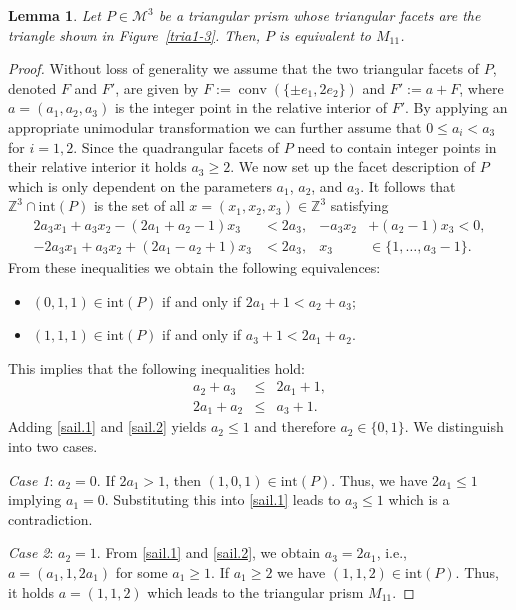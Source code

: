 \documentclass[a4paper]{article}
\theoremstyle{plain}
\newtheorem{lemma}[nn]{Lemma}
\begin{document}
\begin{lemma}
Let $P \in {\mathcal{M}^3}$ be a triangular prism whose triangular facets
are the triangle shown in Figure~\ref{tria1-3}.
Then, $P$ is equivalent to $M_{11}$.
\end{lemma}

\begin{proof}
Without loss of generality we assume that the two triangular
facets of $P$, denoted $F$ and $F'$, are given by
$F := {{\mathop{\mathrm{{conv}}}}}(\{ \pm e_1, 2 e_2\})$ and $F' := a + F$, where
$a = (a_1, a_2, a_3)$ is the integer point in the relative
interior of $F'$.
By applying an appropriate unimodular transformation we can
further assume that $0 \leq a_i < a_3$ for $i = 1,2$.
Since the quadrangular facets of $P$ need to contain integer
points in their relative interior it holds $a_3 \geq 2$.
We now set up the facet description of $P$ which is only
dependent on the parameters $a_1$, $a_2$, and $a_3$.
It follows that ${\mathbb{Z}}^3 \cap {\mathrm{int}}(P)$ is the set of all
$x = (x_1, x_2, x_3) \in {\mathbb{Z}}^3$ satisfying
\begin{align*}
  2 a_3 x_1 + a_3 x_2 - (2a_1 + a_2 - 1) x_3 & < 2 a_3, &
  - a_3 x_2 & + (a_2 - 1) x_3 < 0, \\
  -2 a_3 x_1 + a_3 x_2 + (2a_1 - a_2 + 1) x_3 & < 2 a_3, &
  x_3 & \in \{1,\ldots, a_3 - 1\}.
\end{align*}
From these inequalities we obtain the following
equivalences:
\begin{itemize} 
  \item $(0,1,1) \in {\mathrm{int}}(P)$ if and only if $2a_1 + 1 < a_2 + a_3$;  
  \item $(1,1,1) \in {\mathrm{int}}(P)$ if and only if $a_3 + 1 < 2 a_1 + a_2$. 
\end{itemize}
This implies that the following inequalities hold:
\begin{eqnarray}
  a_2 + a_3   & \le & 2 a_1 + 1, \label{sail.1} \\
  2 a_1 + a_2 & \le & a_3 + 1. \label{sail.2}
\end{eqnarray}
Adding \eqref{sail.1} and \eqref{sail.2} yields $a_2 \leq 1$
and therefore $a_2 \in \{0,1\}$. We distinguish into two
cases.

\emph{Case 1}: $a_2 = 0$.
If $2 a_1 > 1$, then $(1,0,1) \in {\mathrm{int}}(P)$. 
Thus, we have $2 a_1 \leq 1$ implying $a_1 = 0$.
Substituting this into \eqref{sail.1} leads to $a_3 \leq 1$
which is a contradiction.

\emph{Case 2}: $a_2 = 1$.
From \eqref{sail.1} and \eqref{sail.2}, we obtain $a_3 = 2
a_1$, i.e., $a = (a_1,1,2a_1)$ for some $a_1 \geq 1$.
If $a_1 \geq 2$ we have $(1,1,2) \in {\mathrm{int}}(P)$.
Thus, it holds $a = (1,1,2)$ which leads to the triangular
prism $M_{11}$.
\end{proof}
\end{document}
